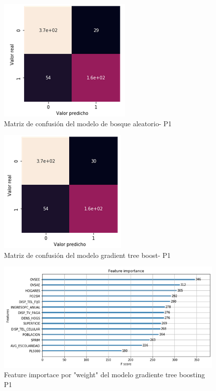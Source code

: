 \documentclass[9pt,twocolumn,twoside]{ilcss}
\begin{document}
\begin{appendices}
\begin{figure}[tbhp]
	\centering
	\includegraphics[width=0.6\linewidth]{images/p1_mc_rd.png}
	\caption{Matriz de confusión del modelo de bosque aleatorio- P1 }
	\label{fig:p1_mc_rd}
\end{figure}

\begin{figure}[tbhp]
	\centering
	\includegraphics[width=0.6\linewidth]{images/p1_mc_xgboost.png}
	\caption{Matriz de confusión del modelo gradient tree boost- P1 }
	\label{fig:p1_mc_xgboost}
\end{figure}

\begin{figure}[tbhp]
	\centering
	\includegraphics[width=1\linewidth]{images/p1_xgboost_weight.png}
	\caption{Feature importace por "weight" del modelo gradiente tree boosting P1}
	\label{fig:p1_xgboost_weight}
\end{figure}


\end{appendices}
\end{document}
